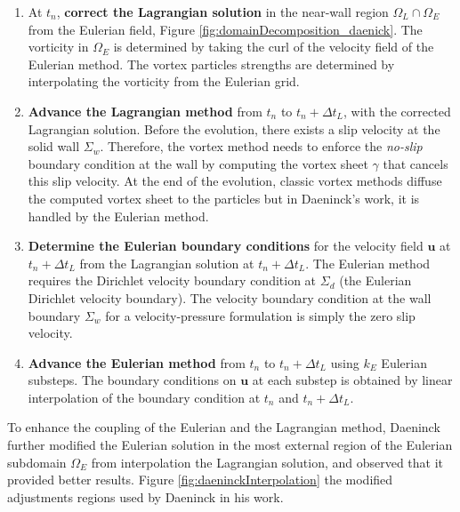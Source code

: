 	\begin{enumerate}
	\item At $t_n$, \textbf{correct the Lagrangian solution} in the near-wall region $\Omega_L\cap\Omega_E$ from the Eulerian field, Figure \ref{fig:domainDecomposition_daenick}. The vorticity in $\Omega_E$ is determined by taking the curl of the velocity field of the Eulerian method. The vortex particles strengths are determined by interpolating the vorticity from the Eulerian grid.
	
	\item \textbf{Advance the Lagrangian method} from $t_n$ to $t_{n}+\Delta t_L$, with the corrected Lagrangian solution. Before the evolution, there exists a slip velocity at the solid wall $\Sigma_w$. Therefore, the vortex method needs to enforce the \textit{no-slip} boundary condition at the wall by computing the vortex sheet $\gamma$ that cancels this slip velocity. At the end of the evolution, classic vortex methods diffuse the computed vortex sheet to the particles but in Daeninck's work, it is handled by the Eulerian method.
	
	\item\textbf{ Determine the Eulerian boundary conditions} for the velocity field $\mathbf{u}$ at $t_{n}+\Delta t_L$ from the Lagrangian solution at $t_{n} + \Delta t_L$. The Eulerian method requires the Dirichlet velocity boundary condition at $\Sigma_d$ (the Eulerian Dirichlet velocity boundary). The velocity boundary condition at the wall boundary $\Sigma_w$ for a velocity-pressure formulation is simply the zero slip velocity. 
	
	\item \textbf{Advance the Eulerian method} from $t_n$ to $t_n + \Delta t_L$ using $k_E$ Eulerian substeps. The boundary conditions on $\mathbf{u}$ at each substep is obtained by linear interpolation of the boundary condition at $t_n$ and $t_{n} + \Delta t_L$.
	\end{enumerate}	
	
	To enhance the coupling of the Eulerian and the Lagrangian method, Daeninck further modified the Eulerian solution in the most external region of the Eulerian subdomain $\Omega_E$ from interpolation the Lagrangian solution, and observed that it provided better results. Figure \ref{fig:daeninckInterpolation} the modified adjustments regions used by Daeninck in his work.
	
